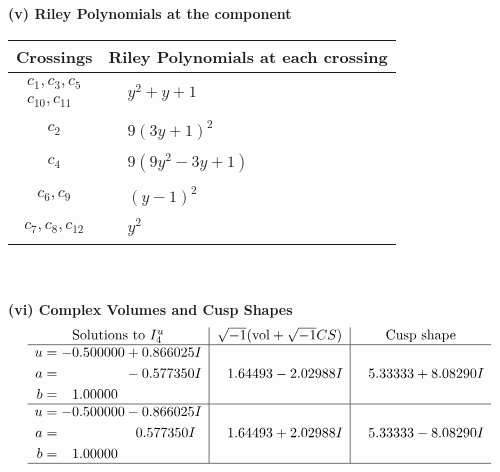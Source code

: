 \documentclass[1p]{elsarticle_modified}
\theoremstyle{definition}
\newcommand{\I}{\sqrt{-1}}
\begin{document}
\newpage\renewcommand{\arraystretch}{1}
\flushleft \textbf{(v) Riley Polynomials at the component}\newline \\
\begin{tabular}{m{50pt}|m{274pt}}
Crossings & \hspace{64pt}Riley Polynomials at each crossing \\
\hline $$\begin{aligned}c_{1},c_{3},c_{5}\\c_{10},c_{11}\end{aligned}$$&$\begin{aligned}
&y^2+y+1
\end{aligned}$\\
\hline $$\begin{aligned}c_{2}\end{aligned}$$&$\begin{aligned}
&9(3 y+1)^2
\end{aligned}$\\
\hline $$\begin{aligned}c_{4}\end{aligned}$$&$\begin{aligned}
&9(9 y^2-3 y+1)
\end{aligned}$\\
\hline $$\begin{aligned}c_{6},c_{9}\end{aligned}$$&$\begin{aligned}
&(y-1)^2
\end{aligned}$\\
\hline $$\begin{aligned}c_{7},c_{8},c_{12}\end{aligned}$$&$\begin{aligned}
&y^2
\end{aligned}$\\
\hline
\end{tabular}\\~\\
\newpage\flushleft \textbf{(vi) Complex Volumes and Cusp Shapes}
$$\begin{array}{c|c|c}  
\text{Solutions to }I^u_{4}& \I (\text{vol} + \sqrt{-1}CS) & \text{Cusp shape}\\
 \hline 
\begin{aligned}
u &= -0.500000 + 0.866025 I \\
a &= \phantom{-0.000000 } -0.577350 I \\
b &= \phantom{-}1.00000\phantom{ +0.000000I}\end{aligned}
 & \phantom{-}1.64493 - 2.02988 I & \phantom{-}5.33333 + 8.08290 I \\ \hline\begin{aligned}
u &= -0.500000 - 0.866025 I \\
a &= \phantom{-0.000000 -}0.577350 I \\
b &= \phantom{-}1.00000\phantom{ +0.000000I}\end{aligned}
 & \phantom{-}1.64493 + 2.02988 I & \phantom{-}5.33333 - 8.08290 I\\
 \hline 
 \end{array}$$\newpage\newpage\renewcommand{\arraystretch}{1}
\end{document}
